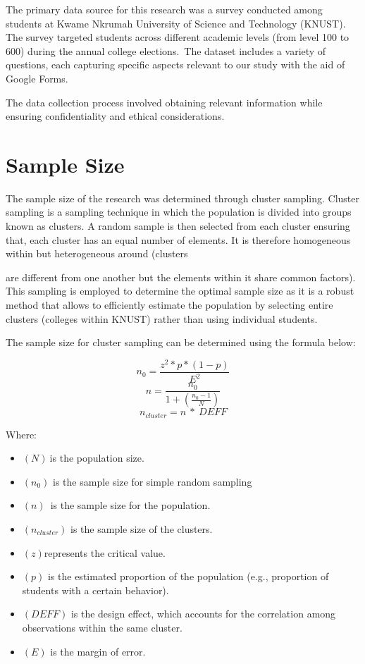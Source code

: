 \documentclass[12pt]{report}
\begin{document}
The primary data source for this research was a survey conducted among students at Kwame Nkrumah University of Science and Technology (KNUST). The survey targeted students across different academic levels (from level 100 to 600) during the annual college elections. The dataset includes a variety of questions, each capturing specific aspects relevant to our study with the aid of Google Forms.

The data collection process involved obtaining relevant information while ensuring confidentiality and ethical considerations.

\section{Sample Size}

The sample size of the research was determined through cluster sampling. Cluster sampling is a sampling technique in which the population is divided into groups known as clusters. A random sample is then selected from each cluster ensuring that, each cluster has an equal number of elements. It is therefore homogeneous within but heterogeneous around (clusters 

are different from one another but the elements within it share common factors). This sampling is employed to determine the optimal sample size as it is a robust method that allows to efficiently estimate the population by selecting entire clusters (colleges within KNUST) rather than using individual students.

The sample size for cluster sampling can be determined using the formula below:

\[n_0=\frac{z^2\ast p\ast\left(1-p\right)}{E^2}\]
\[n=\frac{n_0}{1+(\frac{n_0-1}{N})}\]
\[n_{cluster}=n\ \ast\ DEFF\]

Where:
\begin{itemize}
    \item \((N)\ \)is the population size.
    \item \((n_0)\) is the sample size for simple random sampling
    \item \((n)\)\ is the sample size for the population.
    \item \((n_{cluster})\) is the sample size of the clusters.
    \item \((z) \)represents the critical value.
    \item \((p)\) is the estimated proportion of the population (e.g., proportion of students with a certain behavior).
    \item \((DEFF) \) is the design effect, which accounts for the correlation among observations within the same cluster.
    \item \((E) \) is the margin of error.
\end{itemize}
\end{document}

